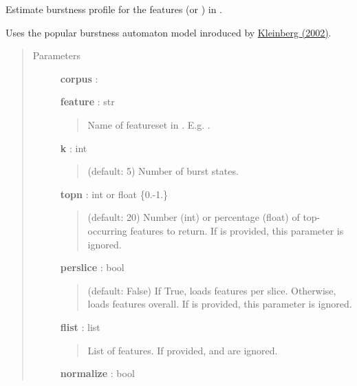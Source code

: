 \documentclass[letterpaper,10pt,english]{sphinxmanual}
\begin{document}
\begin{fulllineitems}
\label{tethne.analyze.corpus:tethne.analyze.corpus.burstness}
Estimate burstness profile for the  features (or ) in 
.

Uses the popular burstness automaton model inroduced by \href{http://www.cs.cornell.edu/home/kleinber/bhs.pdf}{Kleinberg (2002)}.
\begin{quote}\begin{description}
\item[{Parameters}] \leavevmode
\textbf{corpus} : {\hyperref[tethne.classes.corpus:tethne.classes.corpus.Corpus]{}}

\textbf{feature} : str
\begin{quote}

Name of featureset in . E.g. .
\end{quote}

\textbf{k} : int
\begin{quote}

(default: 5) Number of burst states.
\end{quote}

\textbf{topn} : int or float \{0.-1.\}
\begin{quote}

(default: 20) Number (int) or percentage (float) of top-occurring 
features to return. If  is provided, this parameter is ignored.
\end{quote}

\textbf{perslice} : bool
\begin{quote}

(default: False) If True, loads  features per slice. Otherwise,
loads  features overall. If  is provided, this
parameter is ignored.
\end{quote}

\textbf{flist} : list
\begin{quote}

List of features. If provided,  and  are ignored.
\end{quote}

\textbf{normalize} : bool
\begin{quote}


\end{quote}
\end{description}
\end{quote}
\end{fulllineitems}
\end{document}
